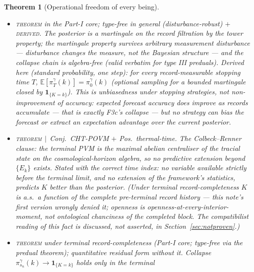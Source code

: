 \documentclass[11pt]{article}
\newtheorem{theorem}{Theorem}
\newcommand{\THM}{{\normalfont\scshape theorem}}                %
\newcommand{\THMC}[1]{{\normalfont\scshape theorem}$\,\mid\,${\normalfont\small #1}} %
\newcommand{\DERIVED}{{\normalfont\scshape derived}}            %
\newcommand{\E}{\mathbb E}
\begin{document}
\begin{theorem}[Operational freedom of every being]
\begin{itemize}
ordinary forward-QM expectation from $\rho_{\rm i}$.
The future boundary shapes which past is realised and provably cannot be used
to send a message into it.
\item[\textbf{(F3a)}] \THM{} in the Part-I core; type-free in general
(disturbance-robust) $+$ \DERIVED{}. The posterior is a martingale on the record
filtration by the tower property; the martingale property survives arbitrary
measurement disturbance --- disturbance changes the measure, not the Bayesian
structure --- and the collapse chain is algebra-free (valid verbatim for type
III preduals).
Derived here (standard probability, one step): for every record-measurable
stopping time $T$, $\E[\pi^\gamma_T(k)]=\pi^\gamma_0(k)$ (optional sampling for
a bounded martingale closed by $\mathbf 1_{\{K=k\}}$). This is
\emph{unbiasedness} under stopping strategies, not non-improvement of accuracy:
expected forecast accuracy does improve as records accumulate --- that is
exactly F3c's collapse --- but no strategy can bias the forecast or extract an
expectation advantage over the current posterior.
\item[\textbf{(F3b)}] \THMC{Conj.\ \textsf{CHT-POVM} $+$ Pos.\ thermal-time}.
The Colbeck--Renner clause: the terminal PVM is the maximal abelian centraliser
of the tracial state on the cosmological-horizon algebra, so no predictive
extension beyond $\{E_k\}$ exists.
Stated with the correct time index: no variable available strictly before the
terminal limit, and no extension of the framework's statistics, predicts $K$
better than the posterior. (Under terminal record-completeness $K$ \emph{is}
a.s.\ a function of the complete pre-terminal record history --- this note's
first version wrongly denied it; openness is openness-at-every-interior-moment,
not ontological chanciness of the completed block. The compatibilist reading of
this fact is discussed, not asserted, in Section~\ref{sec:notproven}.)
\item[\textbf{(F3c)}] \THM{} under terminal record-completeness (Part-I core;
type-free via the predual theorem); quantitative residual form without it.
Collapse $\pi^\gamma_{s_n}(k)\to\mathbf 1_{\{K=k\}}$ holds only in the terminal

\end{itemize}
\end{theorem}
\end{document}

